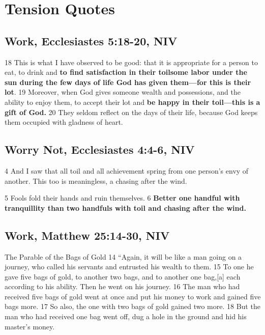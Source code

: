 \documentclass[
]{book}
\begin{document}
\hypertarget{tension-quotes}{%
\section{Tension Quotes}\label{tension-quotes}}

\hypertarget{work-ecclesiastes-518-20-niv}{%
\subsection{Work, Ecclesiastes 5:18-20, NIV}\label{work-ecclesiastes-518-20-niv}}

18 This is what I have observed to be good: that it is appropriate for a person to eat, to drink and \textbf{to find satisfaction in their toilsome labor under the sun during the few days of life God has given them---for this is their lot}. 19 Moreover, when God gives someone wealth and possessions, and the ability to enjoy them, to accept their lot and \textbf{be happy in their toil---this is a gift of God.} 20 They seldom reflect on the days of their life, because God keeps them occupied with gladness of heart.

\hypertarget{worry-not-ecclesiastes-44-6-niv}{%
\subsection{Worry Not, Ecclesiastes 4:4-6, NIV}\label{worry-not-ecclesiastes-44-6-niv}}

4 And I saw that all toil and all achievement spring from one person's envy of another. This too is meaningless, a chasing after the wind.

5 Fools fold their hands
and ruin themselves.
6 \textbf{Better one handful with tranquillity
than two handfuls with toil
and chasing after the wind.}

\hypertarget{work-matthew-2514-30-niv}{%
\subsection{Work, Matthew 25:14-30, NIV}\label{work-matthew-2514-30-niv}}

The Parable of the Bags of Gold
14 ``Again, it will be like a man going on a journey, who called his servants and entrusted his wealth to them. 15 To one he gave five bags of gold, to another two bags, and to another one bag,{[}a{]} each according to his ability. Then he went on his journey. 16 The man who had received five bags of gold went at once and put his money to work and gained five bags more. 17 So also, the one with two bags of gold gained two more. 18 But the man who had received one bag went off, dug a hole in the ground and hid his master's money.
\end{document}
